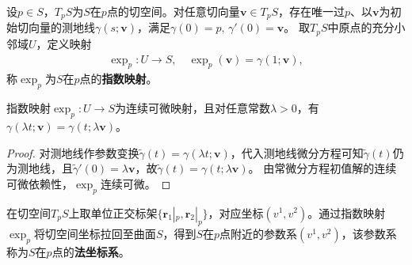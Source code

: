 \documentclass[../../main.tex]{subfiles}%
\begin{document}
\begin{definition}
设$p\in S$，$T_pS$为$S$在$p$点的切空间。对任意切向量$\boldsymbol{v}\in T_pS$，存在唯一过$p$、以$\boldsymbol{v}$为初始切向量的测地线$\gamma(s;\boldsymbol{v})$，满足$\gamma(0)=p,\,\gamma'(0)=\boldsymbol{v}$。
取$T_pS$中原点的充分小邻域$U$，定义映射
\begin{align*}
\exp_p:U\to S,\quad \exp_p(\boldsymbol{v})=\gamma(1;\boldsymbol{v}),
\end{align*}
称$\exp_p$为$S$在$p$点的\textbf{指数映射}。
\end{definition}

\begin{proposition}
指数映射$\exp_p:U\to S$为连续可微映射，且对任意常数$\lambda>0$，有$\gamma(\lambda t;\boldsymbol{v})=\gamma(t;\lambda\boldsymbol{v})$。
\end{proposition}
\begin{proof}

对测地线作参数变换$\tilde{\gamma}(t)=\gamma(\lambda t;\boldsymbol{v})$，代入测地线微分方程可知$\tilde{\gamma}(t)$仍为测地线，且$\tilde{\gamma}'(0)=\lambda\boldsymbol{v}$，故$\tilde{\gamma}(t)=\gamma(t;\lambda\boldsymbol{v})$。
由常微分方程初值解的连续可微依赖性，$\exp_p$连续可微。

\end{proof}

\begin{definition}
在切空间$T_pS$上取单位正交标架$\{\boldsymbol{r}_1|_p,\boldsymbol{r}_2|_p\}$，对应坐标$(v^1,v^2)$。通过指数映射$\exp_p$将切空间坐标拉回至曲面$S$，得到$S$在$p$点附近的参数系$(v^1,v^2)$，该参数系称为$S$在$p$点的\textbf{法坐标系}。
\end{definition}
\end{document}
